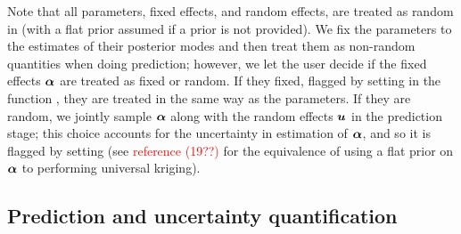 \documentclass[article]{jss}
\newcommand{\red}[1]{\textcolor{red}{#1}}
\newcommand{\fct}[1]{\code{#1()}}
\def\mbf#1{{%
\mathchoice%
{\hbox{\boldmath$\displaystyle{#1}$}}%
{\hbox{\boldmath$\textstyle{#1}$}}%
{\hbox{\boldmath$\scriptstyle{#1}$}}%
{\hbox{\boldmath$\scriptscriptstyle{#1}$}}%
}}
\def\vec{\mbf}
\newcommand{\Gau}{{\text{Gau}}}
\newcommand{\ENoLR}[1]{\mathbb{E}(#1)} %
\newcommand{\precisionNoLR}[1]{{\rm prec}(#1)} %
\begin{document}
Note that all parameters, fixed effects, and random effects, are treated as random in  (with a flat prior assumed if a prior is not provided).
We fix the parameters to the estimates of their posterior modes and then treat them as non-random quantities when doing prediction; however, we let the user decide if the fixed effects $\vec{\alpha}$ are treated as fixed or random. 
If they fixed, flagged by setting  in the function \fct{predict}, they are treated in the same way as the parameters. 
If they are random, we jointly sample $\vec{\alpha}$ along with the random effects $\vec{u}$ in the prediction stage;  this choice accounts for the uncertainty in estimation of $\vec{\alpha}$, and so it is flagged by setting  (see \red{reference (19??)} for the equivalence of using a flat prior on $\vec{\alpha}$ to performing universal kriging). 





\subsection{Prediction and uncertainty quantification}\label{subsection:04-03:Prediction}
\end{document}
